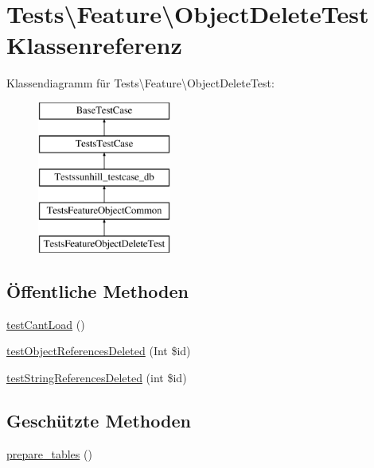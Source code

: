 \hypertarget{classTests_1_1Feature_1_1ObjectDeleteTest}{}\section{Tests\textbackslash{}Feature\textbackslash{}Object\+Delete\+Test Klassenreferenz}
\label{classTests_1_1Feature_1_1ObjectDeleteTest}
Klassendiagramm für Tests\textbackslash{}Feature\textbackslash{}Object\+Delete\+Test\+:\begin{figure}[H]
\begin{center}
\leavevmode
\includegraphics[height=5.000000cm]{d2/d70/classTests_1_1Feature_1_1ObjectDeleteTest}
\end{center}
\end{figure}
\subsection*{Öffentliche Methoden}
\begin{DoxyCompactItemize}
\item 
\hyperlink{classTests_1_1Feature_1_1ObjectDeleteTest_aa4aff2c0fc766eab283aac52416afbb5}{test\+Cant\+Load} ()
\item 
\hyperlink{classTests_1_1Feature_1_1ObjectDeleteTest_a128c1ddf22ba279398856675afd6c136}{test\+Object\+References\+Deleted} (Int \$id)
\item 
\hyperlink{classTests_1_1Feature_1_1ObjectDeleteTest_a9403dc67da9a583f90f2a1e38278cc24}{test\+String\+References\+Deleted} (int \$id)
\end{DoxyCompactItemize}
\subsection*{Geschützte Methoden}
\begin{DoxyCompactItemize}
\item 
\hyperlink{classTests_1_1Feature_1_1ObjectDeleteTest_a6f611ab2a6e719b15e67de096c480c73}{prepare\+\_\+tables} ()
\end{DoxyCompactItemize}
